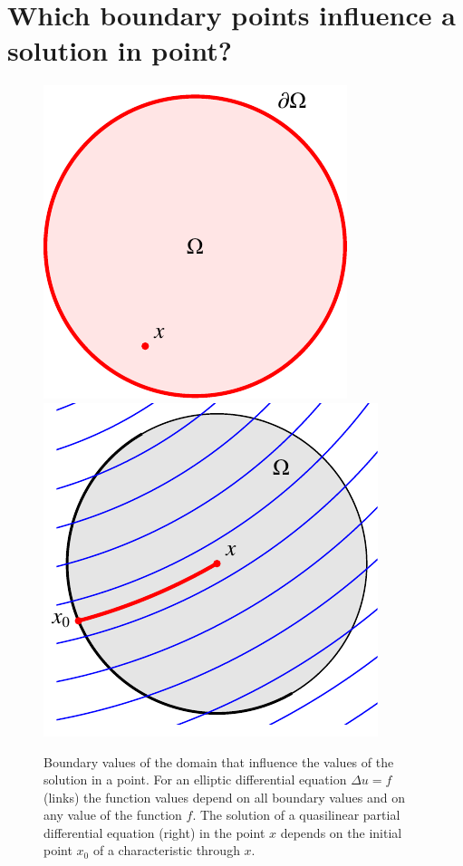 %
%
%
\section{Which boundary points influence a solution in point?
\label{section:which-boundary-points}}
\begin{figure}
\centering
\includegraphics{9-hyperbolic/images/elliptic.pdf}
\qquad\qquad%
\includegraphics{9-hyperbolic/images/ql.pdf}
\caption{Boundary values of the domain that influence the values of the
solution in a point.
For an elliptic differential equation $\Delta u=f$
(links)
the function values depend on all boundary values and on any value
of the function $f$.
The solution of a quasilinear partial differential equation (right)
in the point $x$ depends on the initial point $x_0$ of a characteristic
through $x$.
\label{einflussmenge1}}
\end{figure}

